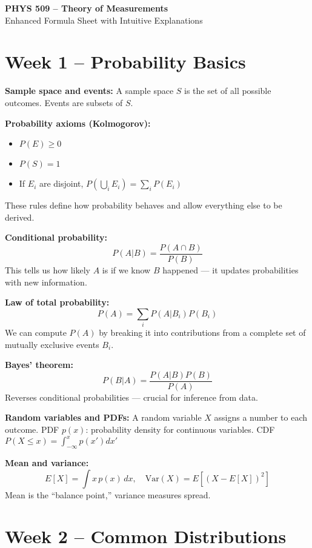\documentclass[11pt]{article}
\begin{document}
\begin{center}
    {\LARGE \textbf{PHYS 509 – Theory of Measurements}}\\[4pt]
    {\large Enhanced Formula Sheet with Intuitive Explanations}
\end{center}

\tableofcontents

\newpage

\section*{Week 1 – Probability Basics}

\textbf{Sample space and events:}
A sample space $S$ is the set of all possible outcomes. Events are subsets of $S$.

\textbf{Probability axioms (Kolmogorov):}
\begin{itemize}
    \item $P(E) \ge 0$
    \item $P(S) = 1$
    \item If $E_i$ are disjoint, $P\left(\bigcup_i E_i\right) = \sum_i P(E_i)$
\end{itemize}
These rules define how probability behaves and allow everything else to be derived.

\textbf{Conditional probability:}
\[
    P(A|B) = \frac{P(A \cap B)}{P(B)}
\]
This tells us how likely $A$ is if we know $B$ happened — it updates probabilities with new information.

\textbf{Law of total probability:}
\[
    P(A) = \sum_i P(A|B_i) P(B_i)
\]
We can compute $P(A)$ by breaking it into contributions from a complete set of mutually exclusive events $B_i$.

\textbf{Bayes’ theorem:}
\[
    P(B|A) = \frac{P(A|B)P(B)}{P(A)}
\]
Reverses conditional probabilities — crucial for inference from data.

\textbf{Random variables and PDFs:}
A random variable $X$ assigns a number to each outcome.
PDF $p(x)$: probability density for continuous variables.
CDF $P(X \le x) = \int_{-\infty}^x p(x') dx'$

\textbf{Mean and variance:}
\[
    E[X] = \int x\,p(x)\,dx, \quad \mathrm{Var}(X) = E[(X - E[X])^2]
\]
Mean is the “balance point,” variance measures spread.

\section*{Week 2 – Common Distributions}
\end{document}

